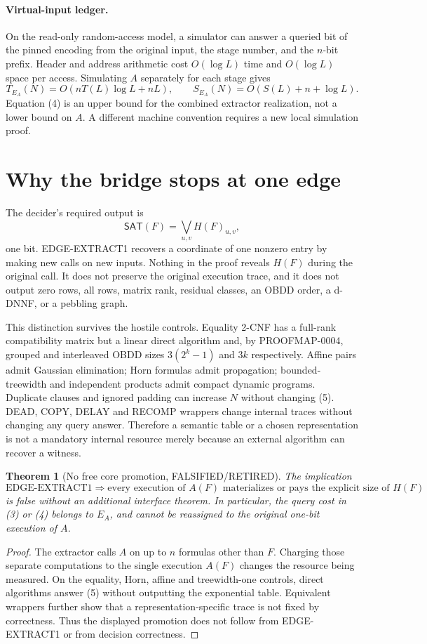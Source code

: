 \documentclass[11pt]{article}
\newtheorem{theorem}{Theorem}
\newcommand{\SAT}{\mathsf{SAT}}
\begin{document}
\paragraph{Virtual-input ledger.}
On the read-only random-access model, a simulator can answer a queried bit
of the pinned encoding from the original input, the stage number, and the
$n$-bit prefix.  Header and address arithmetic cost $O(\log L)$ time and
$O(\log L)$ space per access.  Simulating $A$ separately for each stage gives
\[
 T_{E_A}(N)=O\!\left(nT(L)\log L+nL\right),\qquad
 S_{E_A}(N)=O\!\left(S(L)+n+\log L\right).                 \tag{4}
\]
Equation (4) is an upper bound for the combined extractor realization, not
a lower bound on $A$.  A different machine convention requires a new local
simulation proof.

\section{Why the bridge stops at one edge}
The decider's required output is
\[
 \SAT(F)=\bigvee_{u,v}H(F)_{u,v},                          \tag{5}
\]
one bit.  EDGE-EXTRACT1 recovers a coordinate of one nonzero entry by
making new calls on new inputs.  Nothing in the proof reveals $H(F)$ during
the original call.  It does not preserve the original execution trace, and
it does not output zero rows, all rows, matrix rank, residual classes, an
OBDD order, a d-DNNF, or a pebbling graph.

This distinction survives the hostile controls.  Equality 2-CNF has a
full-rank compatibility matrix but a linear direct algorithm and, by
PROOFMAP-0004, grouped and interleaved OBDD sizes
$3(2^k-1)$ and $3k$ respectively.  Affine pairs admit Gaussian elimination;
Horn formulas admit propagation; bounded-treewidth and independent products
admit compact dynamic programs.  Duplicate clauses and ignored padding can
increase $N$ without changing (5).  DEAD, COPY, DELAY and RECOMP wrappers
change internal traces without changing any query answer.  Therefore a
semantic table or a chosen representation is not a mandatory internal
resource merely because an external algorithm can recover a witness.

\begin{theorem}[No free core promotion, FALSIFIED/RETIRED]
The implication
\[
 \text{EDGE-EXTRACT1}
 \Longrightarrow
 \text{every execution of }A(F)\text{ materializes or pays the explicit
 size of }H(F)
\]
is false without an additional interface theorem.  In particular, the
query cost in (3) or (4) belongs to $E_A$, and cannot be reassigned to the
original one-bit execution of $A$.
\end{theorem}
\begin{proof}
The extractor calls $A$ on up to $n$ formulas other than $F$.  Charging those
separate computations to the single execution $A(F)$ changes the resource
being measured.  On the equality, Horn, affine and treewidth-one controls,
direct algorithms answer (5) without outputting the exponential table.
Equivalent wrappers further show that a representation-specific trace is
not fixed by correctness.  Thus the displayed promotion does not follow
from EDGE-EXTRACT1 or from decision correctness.
\end{proof}
\end{document}
